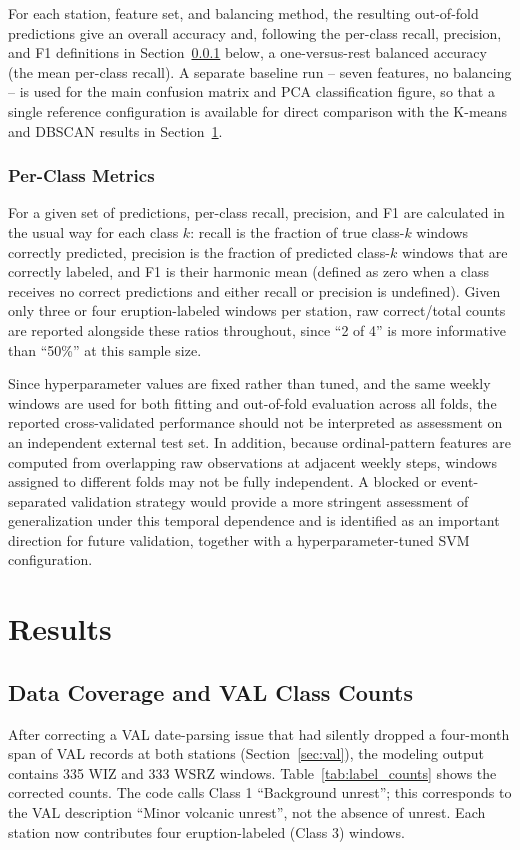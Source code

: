 \documentclass[11pt,a4paper]{article}
\begin{document}
For each station, feature set, and balancing method, the resulting out-of-fold predictions give an overall accuracy and, following the per-class recall, precision, and F1 definitions in Section~\ref{sec:methods-metrics} below, a one-versus-rest balanced accuracy (the mean per-class recall). A separate baseline run -- seven features, no balancing -- is used for the main confusion matrix and PCA classification figure, so that a single reference configuration is available for direct comparison with the K-means and DBSCAN results in Section~\ref{sec:results}.

\subsubsection{Per-Class Metrics}\label{sec:methods-metrics}

For a given set of predictions, per-class recall, precision, and F1 are calculated in the usual way for each class $k$: recall is the fraction of true class-$k$ windows correctly predicted, precision is the fraction of predicted class-$k$ windows that are correctly labeled, and F1 is their harmonic mean (defined as zero when a class receives no correct predictions and either recall or precision is undefined). Given only three or four eruption-labeled windows per station, raw correct/total counts are reported alongside these ratios throughout, since ``2 of 4'' is more informative than ``50\%'' at this sample size.

Since hyperparameter values are fixed rather than tuned, and the same weekly windows are used for both fitting and out-of-fold evaluation across all folds, the reported cross-validated performance should not be interpreted as assessment on an independent external test set. In addition, because ordinal-pattern features are computed from overlapping raw observations at adjacent weekly steps, windows assigned to different folds may not be fully independent. A blocked or event-separated validation strategy would provide a more stringent assessment of generalization under this temporal dependence and is identified as an important direction for future validation, together with a hyperparameter-tuned SVM configuration.

\section{Results}\label{sec:results}
\subsection{Data Coverage and VAL Class Counts}
After correcting a VAL date-parsing issue that had silently dropped a four-month span of VAL records at both stations (Section~\ref{sec:val}), the modeling output contains 335 WIZ and 333 WSRZ windows. Table~\ref{tab:label_counts} shows the corrected counts. The code calls Class 1 ``Background unrest''; this corresponds to the VAL description ``Minor volcanic unrest'', not the absence of unrest. Each station now contributes four eruption-labeled (Class 3) windows.
\end{document}
